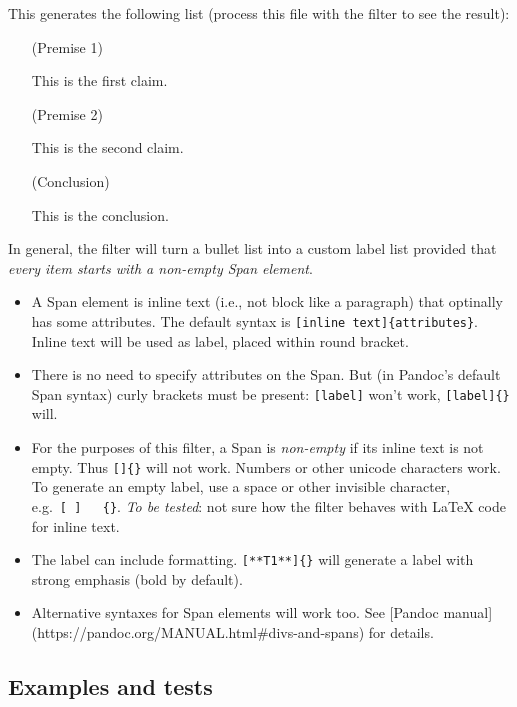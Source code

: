 This generates the following list (process this file with the filter to
see the result):

\begin{itemize}
\tightlist

\item[(Premise 1)]

This is the first claim.

\item[(Premise 2)]

This is the second claim.

\item[(Conclusion)]

This is the conclusion.

\end{itemize}

In general, the filter will turn a bullet list into a custom label list
provided that \emph{every item starts with a non-empty Span element}.

\begin{itemize}
\tightlist
\item
  A Span element is inline text (i.e., not block like a paragraph) that
  optinally has some attributes. The default syntax is
  \texttt{{[}inline\ text{]}\{attributes\}}. Inline text will be used as
  label, placed within round bracket.
\item
  There is no need to specify attributes on the Span. But (in Pandoc's
  default Span syntax) curly brackets must be present:
  \texttt{{[}label{]}} won't work, \texttt{{[}label{]}\{\}} will.
\item
  For the purposes of this filter, a Span is \emph{non-empty} if its
  inline text is not empty. Thus \texttt{{[}{]}\{\}} will not work.
  Numbers or other unicode characters work. To generate an empty label,
  use a space or other invisible character,
  e.g.~\texttt{{[}\ {]}\ \ \ \{\}}. \emph{To be tested}: not sure how
  the filter behaves with LaTeX code for inline text.
\item
  The label can include formatting. \texttt{{[}**T1**{]}\{\}} will
  generate a label with strong emphasis (bold by default).
\item
  Alternative syntaxes for Span elements will work too. See {[}Pandoc
  manual{]} (https://pandoc.org/MANUAL.html\#divs-and-spans) for
  details.
\end{itemize}

\hypertarget{examples-and-tests}{%
\subsection{Examples and tests}\label{examples-and-tests}}

